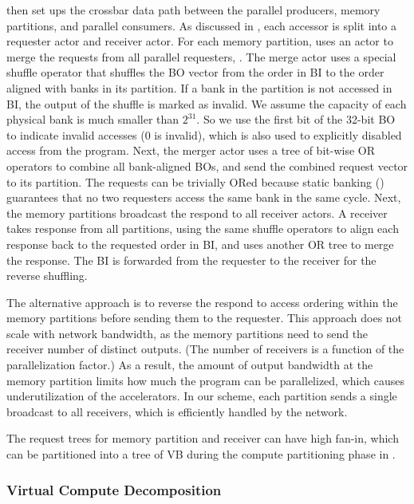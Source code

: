 

\name{} then set ups the crossbar data path between the parallel producers, memory partitions, and parallel consumers.
As discussed in , each accessor is split into a requester actor and receiver actor.
For each memory partition, \name{} uses an actor to merge the requests from all parallel requesters, .
The merge actor uses a special shuffle operator that shuffles the BO vector from the order in BI to the order aligned with banks in its partition.
If a bank in the partition is not accessed in BI, the output of the shuffle is marked as invalid.
We assume the capacity of each physical bank is much smaller than $2^{31}$. 
So we use the first bit of the 32-bit BO to indicate invalid accesses (0 is invalid), which is also used to explicitly disabled access from the program.
Next, the merger actor uses a tree of bit-wise OR operators to combine all bank-aligned BOs, and send the combined request vector to its partition.
The requests can be trivially ORed because static banking () guarantees that no two requesters access the same bank in the same cycle.
Next, the memory partitions broadcast the respond to all receiver actors.
A receiver takes response from all partitions, using the same shuffle operators to align each response back to the requested order in BI, and uses another OR tree to merge the response. 
The BI is forwarded from the requester to the receiver for the reverse shuffling.

The alternative approach is to reverse the respond to access ordering within the memory partitions before sending them to the requester.
This approach does not scale with network bandwidth, as the memory partitions need to send the receiver number of distinct outputs.
(The number of receivers is a function of the parallelization factor.) 
As a result, the amount of output bandwidth at the memory partition limits how much the program can be parallelized, which causes underutilization of the accelerators.
In our scheme, each partition sends a single broadcast to all receivers, which is efficiently handled by the network.

The request trees for memory partition and receiver can have high fan-in, which can 
be partitioned into a tree of VB during the compute partitioning phase in .

\subsubsection{Virtual Compute Decomposition} 
\label{sec:compsplit}

